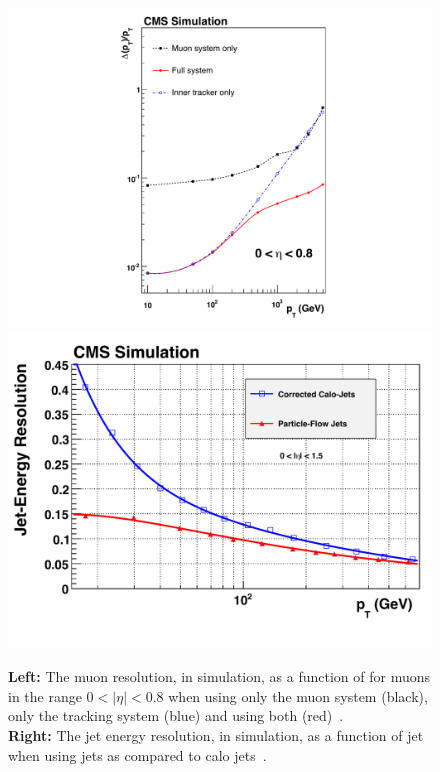 \begin{figure}
  \includegraphics[height=0.4\textwidth]{cms_experiment/plots/MuonResolution_fix.pdf}
  \includegraphics[height=0.4\textwidth]{cms_experiment/plots/BarrelResolutionPFAndCalo_fix.pdf}
  \caption[Particle flow jet resolution]{\textbf{Left:} The muon \pT resolution, in \MC simulation, as a function of \pT for muons in the range $0<|\eta|<0.8$ when using only the muon system (black), only the tracking system (blue) and using both (red)~\cite{CMS_JINST}. \\ \textbf{Right:} The jet energy resolution, in \MC simulation, as a function of jet \pT when using \PF jets as compared to calo jets~\cite{cms_pf_performance}.}
  \label{fig:muon_jet_res}
\end{figure}

